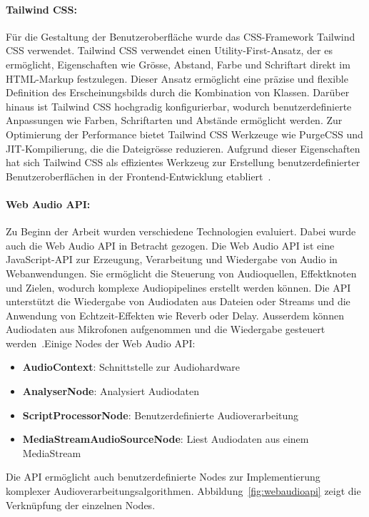 \paragraph{Tailwind CSS:}
Für die Gestaltung der Benutzeroberfläche wurde das CSS-Framework Tailwind CSS verwendet. Tailwind CSS verwendet einen Utility-First-Ansatz, der es ermöglicht, Eigenschaften wie Grösse, Abstand, Farbe und Schriftart direkt im HTML-Markup festzulegen. Dieser Ansatz ermöglicht eine präzise und flexible Definition des Erscheinungsbilds durch die Kombination von Klassen. Darüber hinaus ist Tailwind CSS hochgradig konfigurierbar, wodurch benutzerdefinierte Anpassungen wie Farben, Schriftarten und Abstände ermöglicht werden. Zur Optimierung der Performance bietet Tailwind CSS Werkzeuge wie PurgeCSS und JIT-Kompilierung, die die Dateigrösse reduzieren. Aufgrund dieser Eigenschaften hat sich Tailwind CSS als effizientes Werkzeug zur Erstellung benutzerdefinierter Benutzeroberflächen in der Frontend-Entwicklung etabliert~\cite{tailwind_css}.

\paragraph{Web Audio API:}
Zu Beginn der Arbeit wurden verschiedene Technologien evaluiert. Dabei wurde auch die Web Audio API in Betracht gezogen. Die Web Audio API ist eine JavaScript-API zur Erzeugung, Verarbeitung und Wiedergabe von Audio in Webanwendungen. Sie ermöglicht die Steuerung von Audioquellen, Effektknoten und Zielen, wodurch komplexe Audiopipelines erstellt werden können. Die API unterstützt die Wiedergabe von Audiodaten aus Dateien oder Streams und die Anwendung von Echtzeit-Effekten wie Reverb oder Delay. Ausserdem können Audiodaten aus Mikrofonen aufgenommen und die Wiedergabe gesteuert werden~\cite{mdn_web_audio_api}.Einige Nodes der Web Audio API:
\begin{itemize}
\item \textbf{AudioContext}: Schnittstelle zur Audiohardware
\item \textbf{AnalyserNode}: Analysiert Audiodaten
\item \textbf{ScriptProcessorNode}: Benutzerdefinierte Audioverarbeitung
\item \textbf{MediaStreamAudioSourceNode}: Liest Audiodaten aus einem MediaStream
\end{itemize}

Die API ermöglicht auch benutzerdefinierte Nodes zur Implementierung komplexer Audioverarbeitungsalgorithmen. Abbildung~\ref{fig:webaudioapi} zeigt die Verknüpfung der einzelnen Nodes.


